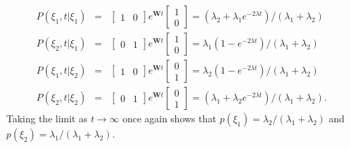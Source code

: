 \begin{eqnarray}
P(\xi_1, t|\xi_1) &=& \left[\begin{array}{cc} 1 & 0  \end{array}\right] e^{\textbf{W}t} \left[\begin{array}{c} 1 \\ 0  \end{array}\right] = (\lambda_2 + \lambda_1 e^{-2 \lambda t}) / (\lambda_1 + \lambda_2) \\
P(\xi_2, t|\xi_1) &=& \left[\begin{array}{cc} 0 & 1  \end{array}\right] e^{\textbf{W}t} \left[\begin{array}{c} 1 \\ 0  \end{array}\right] = \lambda_1 (1-e^{-2 \lambda t}) / (\lambda_1 + \lambda_2) \\
P(\xi_1, t|\xi_2) &=& \left[\begin{array}{cc} 1 & 0  \end{array}\right] e^{\textbf{W}t} \left[\begin{array}{c} 0 \\ 1  \end{array}\right] = \lambda_2 (1-e^{-2 \lambda t}) / (\lambda_1 + \lambda_2) \\
P(\xi_2, t|\xi_2) &=& \left[\begin{array}{cc} 0 & 1  \end{array}\right] e^{\textbf{W}t} \left[\begin{array}{c} 0 \\ 1  \end{array}\right] = (\lambda_1 + \lambda_2 e^{-2 \lambda t}) / (\lambda_1 + \lambda_2).
\end{eqnarray}
Taking the limit as $t \rightarrow \infty$ once again shows that  $p(\xi_1) = \lambda_2/(\lambda_1 + \lambda_2)$ and $p(\xi_2) = \lambda_1/(\lambda_1 + \lambda_2)$.

